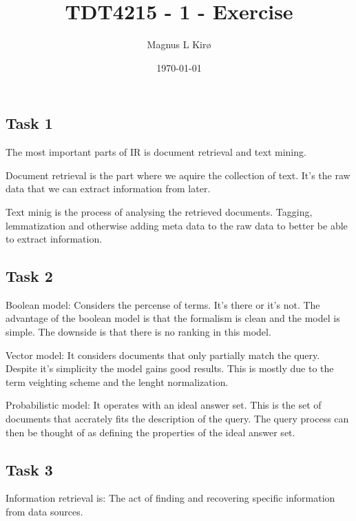 \documentclass[12pt, a4paper]{article}
\title{TDT4215 - 1 - Exercise}
\author{
        Magnus L Kirø
}
\date{\today}
\begin{document}
\maketitle
{}


\subsection{Task 1}

The most important parts of  IR is document retrieval and text mining. 

Document retrieval is the part where we aquire the collection of text. 
It's the raw data that we can extract information from later. 

Text minig is the process of analysing the retrieved documents. 
Tagging, lemmatization and otherwise adding meta data to the raw data to better be able to extract information. 

\subsection{Task 2}

Boolean model:
Considers the percense of terms. It's there or it's not. 
The advantage of the boolean model is that the formalism is clean and the model is simple. 
The downside is that there is no ranking in this model. 

Vector model:
It considers documents that only partially match the query. 
Despite it's simplicity the model gains good results. 
This is mostly due to the term veighting scheme and the lenght normalization. 

Probabilistic model:
It operates with an ideal answer set. This is the set of documents that accrately fits the description of the query. 
The query process can then be thought of as defining the properties of the ideal answer set. 

\subsection{Task 3}
Information retrieval is: The act of finding and recovering specific information from data sources. 
\end{document}
